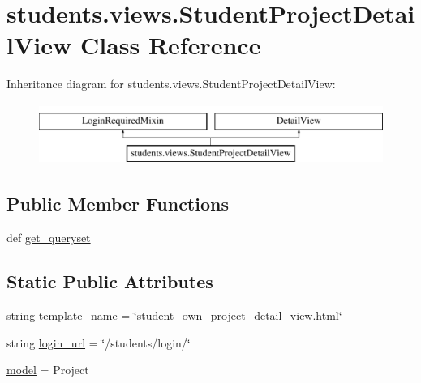 \hypertarget{classstudents_1_1views_1_1_student_project_detail_view}{\section{students.\-views.\-Student\-Project\-Detail\-View Class Reference}
\label{classstudents_1_1views_1_1_student_project_detail_view}
}
Inheritance diagram for students.\-views.\-Student\-Project\-Detail\-View\-:\begin{figure}[H]
\begin{center}
\leavevmode
\includegraphics[height=2.000000cm]{classstudents_1_1views_1_1_student_project_detail_view}
\end{center}
\end{figure}
\subsection*{Public Member Functions}
\begin{DoxyCompactItemize}
\item 
def \hyperlink{classstudents_1_1views_1_1_student_project_detail_view_aa6147461550ece1940834db56b32960f}{get\-\_\-queryset}
\end{DoxyCompactItemize}
\subsection*{Static Public Attributes}
\begin{DoxyCompactItemize}
\item 
string \hyperlink{classstudents_1_1views_1_1_student_project_detail_view_a58ec5230c2c0d52ad42510d59e0d647e}{template\-\_\-name} = \char`\"{}student\-\_\-own\-\_\-project\-\_\-detail\-\_\-view.\-html\char`\"{}
\item 
string \hyperlink{classstudents_1_1views_1_1_student_project_detail_view_aa703710c9bb127a1d2ac4e279e329f69}{login\-\_\-url} = \char`\"{}/students/login/\char`\"{}
\item 
\hyperlink{classstudents_1_1views_1_1_student_project_detail_view_a787cda8d76de994a180a8dda8f10e124}{model} = Project
\end{DoxyCompactItemize}


